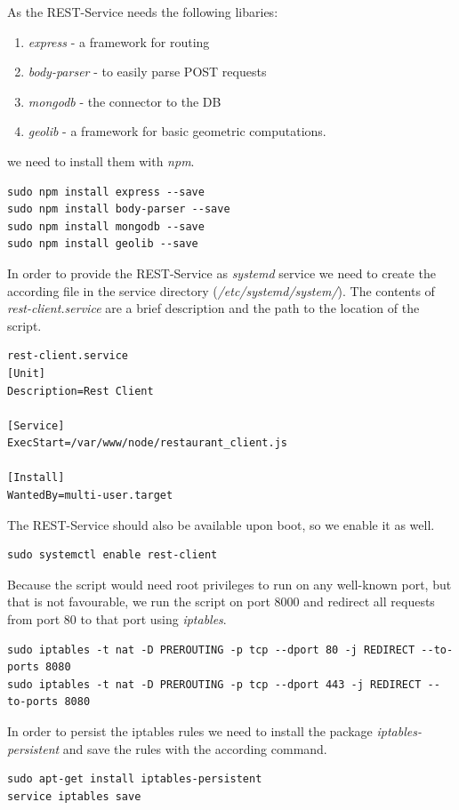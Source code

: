 As the REST-Service needs the following libaries:
\begin{enumerate}
	\item \textit{express} - a framework for routing
	\item \textit{body-parser} - to easily parse POST requests
	\item \textit{mongodb} - the connector to the DB
	\item \textit{geolib} - a framework for basic geometric computations.
\end{enumerate}
we need to install them with \textit{npm}.
\begin{lstlisting}
sudo npm install express --save
sudo npm install body-parser --save
sudo npm install mongodb --save
sudo npm install geolib --save
\end{lstlisting}

In order to provide the REST-Service as \textit{systemd} service we need to create the according file in the service directory (\textit{/etc/systemd/system/}). The contents of \textit{rest-client.service} are a brief description and the path to the location of the script.
\begin{lstlisting}
rest-client.service
[Unit]
Description=Rest Client

[Service]
ExecStart=/var/www/node/restaurant_client.js

[Install]
WantedBy=multi-user.target
\end{lstlisting}

The REST-Service should also be available upon boot, so we enable it as well.
\begin{lstlisting}
sudo systemctl enable rest-client
\end{lstlisting}

Because the script would need root privileges to run on any well-known port, but that is not favourable, we run the script on port 8000 and redirect all requests from port 80 to that port using \textit{iptables}.
\begin{lstlisting}
sudo iptables -t nat -D PREROUTING -p tcp --dport 80 -j REDIRECT --to-ports 8080
sudo iptables -t nat -D PREROUTING -p tcp --dport 443 -j REDIRECT --to-ports 8080
\end{lstlisting}
In order to persist the iptables rules we need to install the package \textit{iptables-persistent} and save the rules with the according command.
\begin{lstlisting}
sudo apt-get install iptables-persistent
service iptables save
\end{lstlisting}

